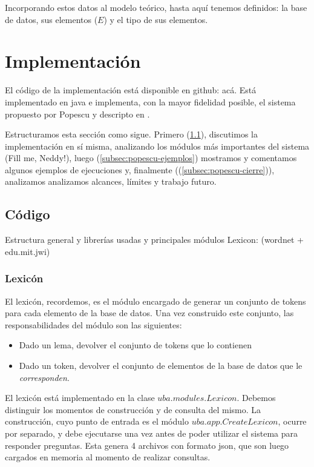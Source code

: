 Incorporando estos datos al modelo teórico, hasta aquí tenemos definidos: la base de datos, sus elementos ($E$) y el tipo de sus elementos.


\section{Implementación}
\label{sec:popescu-implementacion}

El código de la implementación está disponible en github: acá. Está implementado en java e implementa, con la mayor fidelidad posible, el sistema propuesto por Popescu y descripto en .

Estructuramos esta sección como sigue. Primero (\ref{subsec:popescu-codigo}), discutimos la implementación en sí misma, analizando los módulos más importantes del sistema  (Fill me, Neddy!), luego (\ref{subsec:popescu-ejemplos}) mostramos y comentamos algunos ejemplos de ejecuciones y, finalmente ((\ref{subsec:popescu-cierre})), analizamos analizamos alcances, límites y trabajo futuro.

\subsection{Código}
\label{subsec:popescu-codigo}

Estructura general y librerías usadas y principales módulos
Lexicon: (wordnet + edu.mit.jwi)

\subsubsection*{Lexicón}
\label{subsubsec:lexicon}
El lexicón, recordemos, es el módulo encargado de generar un conjunto de tokens para cada  elemento de la base de datos. Una vez construido este conjunto, las responsabilidades del módulo son las siguientes:
\begin{itemize}
	\item Dado un lema, devolver el conjunto de tokens que lo contienen
	\item Dado un token, devolver el conjunto de elementos de la base de datos que le \textit{corresponden}.
\end{itemize}

El lexicón está implementado en la clase $uba.modules.Lexicon$. Debemos distinguir los momentos de construcción y de consulta del mismo. La construcción, cuyo punto de entrada es el módulo $uba.app.CreateLexicon$, ocurre por separado, y debe ejecutarse una vez antes de poder utilizar el sistema para responder preguntas. Esta genera 4 archivos con formato json, que son luego cargados en memoria al momento de realizar consultas.

